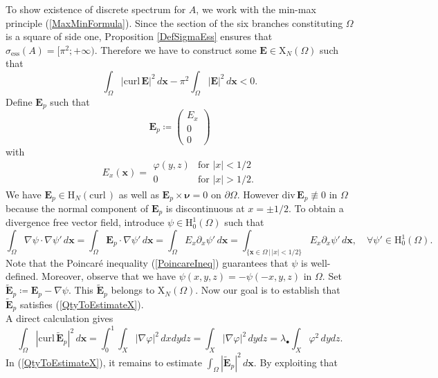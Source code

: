 \documentclass[11pt,a4paper]{article}
\newcommand{\dsp}{\displaystyle}
\newcommand{\Om}{\Omega}
\newcommand{\mrm}[1]{\mathrm{#1}}
\newcommand{\bfx}{\boldsymbol{x}}
\newcommand{\bfnu}{\boldsymbol{\nu}}
\newcommand{\mH}{\mrm{H}}
\newcommand{\mX}{\mrm{X}}
\newcommand{\curlvec}{\boldsymbol{\mrm{curl}}\,}
\renewcommand{\div}{\mrm{div}}
\newcommand{\GX}{X}
\def\E{\boldsymbol{E}}
\begin{document}
To show existence of discrete spectrum for $A$, we work with the min-max principle (\ref{MaxMinFormula}). Since the section of the six branches constituting $\Om$ is a square of side one, Proposition \ref{DefSigmaEss} ensures that $\sigma_{\mrm{ess}}(A)=[\pi^2;+\infty)$. Therefore we have to construct some $\E\in\boldsymbol{\mX}_N(\Om)$ such that 
\begin{equation}\label{QtyToEstimateX}
\int_{\Om} |\curlvec\E|^2\,d\bfx-\pi^2\int_{\Om} |\E|^2\,d\bfx<0.
\end{equation}
Define $\E_p$ such that 
\begin{equation}\label{DefEpX}
\E_p\coloneqq\left(\begin{array}{c}
E_x\\
0\\
0
\end{array}\right)
\end{equation}
with
\[
E_x(\bfx)=\begin{array}{|ll}
\varphi(y,z)& \mbox{for }|x|<1/2\\
0& \mbox{for }|x|>1/2.
\end{array}
\]
We have $\E_{p}\in \boldsymbol{\mH}_N(\curlvec)$ as well as $\E_{p}\times\bfnu=0$ on $\partial\Om$. However $\div\,\E_{p}\not\equiv0$ in $\Om$ because the normal component of $\E_{p}$ is discontinuous at $x=\pm1/2$. To obtain a divergence free vector field, introduce $\psi\in\mH^1_0(\Om)$ such that
\begin{equation}\label{PbDefPsi}
\int_\Om\nabla\psi\cdot\nabla\psi'\,d\bfx=\int_\Om\E_{p}\cdot\nabla\psi'\,d\bfx=\int_\Om E_x\partial_x\psi'\,d\bfx=\int_{\{\bfx\in\Om\,|\,|x|<1/2\}} E_x\partial_x\psi'\,d\bfx,\quad \forall\psi'\in\mH^1_0(\Om).
\end{equation}
Note that the Poincar\'e inequality (\ref{PoincareIneq}) guarantees that $\psi$ is well-defined. Moreover, observe that we have $\psi(x,y,z)=-\psi(-x,y,z)$ in $\Om$.  Set $\tilde{\E}_{p}\coloneqq\E_{p}-\nabla\psi$. This $\tilde{\E}_{p}$ belongs to $\boldsymbol{\mX}_N(\Om)$. Now our goal is to establish that $\tilde{\E}_p$ satisfies (\ref{QtyToEstimateX}).\\
\newline
A direct calculation gives 
\begin{equation}\label{EstimAboveX}
\dsp\int_{\Om}|\curlvec \tilde{\E}_p|^2\,d\bfx=\int_0^1\int_\GX|\nabla\varphi|^2\,dxdydz=\int_\GX|\nabla\varphi|^2\,dydz=\lambda_\bullet\int_\GX\varphi^2\,dydz.
\end{equation}
\noindent In (\ref{QtyToEstimateX}), it remains to estimate $\int_{\Om} |\tilde{\E}_{p}|^2\,d\bfx$. By exploiting that 
\end{document}

